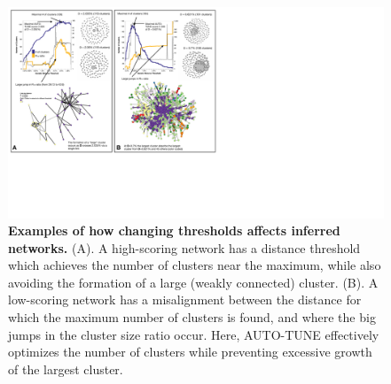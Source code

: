 \documentclass[utf8]{FrontiersinHarvard} %
\begin{document}
\begin{figure}[h!]
	\centering
	\includegraphics[width=1.\textwidth]{figures/cases.pdf}
	\vspace{0.01in}
	\caption{\textbf{Examples of how changing thresholds affects inferred networks.}
		(A). A high-scoring network \cite{bbosa_short_2020} has a distance threshold which achieves the number of clusters near the maximum, while also avoiding the formation of a large (weakly connected) cluster. (B). A low-scoring network \cite{liu_dynamics_2020} has a misalignment between the distance for which the maximum number of clusters is found, and where the big jumps in the cluster size ratio occur. Here, AUTO-TUNE effectively optimizes the number of clusters while preventing excessive growth of the largest cluster.}
	\label{fig:cases}
\end{figure}
\end{document}
